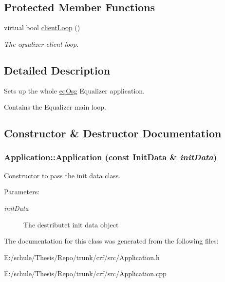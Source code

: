 \subsection*{Protected Member Functions}
\begin{CompactItemize}
\item 
\hypertarget{a00001_8b3cb53c57a36c01761b4fe74f9adbb0}{
virtual bool \hyperlink{a00001_8b3cb53c57a36c01761b4fe74f9adbb0}{clientLoop} ()}
\label{a00001_8b3cb53c57a36c01761b4fe74f9adbb0}

\begin{CompactList}\small\item\em The equalizer client loop. \item\end{CompactList}\end{CompactItemize}


\subsection{Detailed Description}
Sets up the whole \hyperlink{a00045}{eqOsg} Equalizer application. 

Contains the Equalizer main loop. 

\subsection{Constructor \& Destructor Documentation}
\hypertarget{a00001_004ad4bb523a1a7ffe7a3e53c3eb82e2}{
\subsubsection[{Application}]{\setlength{\rightskip}{0pt plus 5cm}Application::Application (const {\bf InitData} \& {\em initData})}}
\label{a00001_004ad4bb523a1a7ffe7a3e53c3eb82e2}


Constructor to pass the init data class. 

\begin{Desc}
\item[Parameters:]
\begin{description}
\item[{\em initData}]The destributet init data object \end{description}
\end{Desc}


The documentation for this class was generated from the following files:\begin{CompactItemize}
\item 
E:/schule/Thesis/Repo/trunk/crf/src/Application.h\item 
E:/schule/Thesis/Repo/trunk/crf/src/Application.cpp\end{CompactItemize}
